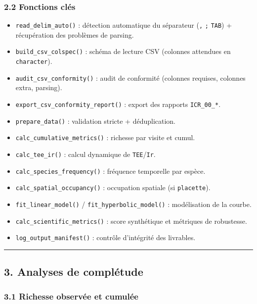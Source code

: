 \subsubsection{2.2 Fonctions clés}\label{fonctions-cluxe9s}

\begin{itemize}
\tightlist
\item
  \texttt{read\_delim\_auto()} : détection automatique du séparateur
  (\texttt{,} \texttt{;} \texttt{TAB}) + récupération des problèmes de
  parsing.
\item
  \texttt{build\_csv\_colspec()} : schéma de lecture CSV (colonnes
  attendues en \texttt{character}).
\item
  \texttt{audit\_csv\_conformity()} : audit de conformité (colonnes
  requises, colonnes extra, parsing).
\item
  \texttt{export\_csv\_conformity\_report()} : export des rapports
  \texttt{ICR\_00\_*}.
\item
  \texttt{prepare\_data()} : validation stricte + déduplication.
\item
  \texttt{calc\_cumulative\_metrics()} : richesse par visite et cumul.
\item
  \texttt{calc\_tee\_ir()} : calcul dynamique de
  \texttt{TEE}/\texttt{Ir}.
\item
  \texttt{calc\_species\_frequency()} : fréquence temporelle par espèce.
\item
  \texttt{calc\_spatial\_occupancy()} : occupation spatiale (si
  \texttt{placette}).
\item
  \texttt{fit\_linear\_model()} / \texttt{fit\_hyperbolic\_model()} :
  modélisation de la courbe.
\item
  \texttt{calc\_scientific\_metrics()} : score synthétique et métriques
  de robustesse.
\item
  \texttt{log\_output\_manifest()} : contrôle d'intégrité des livrables.
\end{itemize}

\begin{center}\rule{0.5\linewidth}{0.5pt}\end{center}

\subsection{3. Analyses de complétude}\label{analyses-de-compluxe9tude}

\subsubsection{3.1 Richesse observée et
cumulée}\label{richesse-observuxe9e-et-cumuluxe9e}

